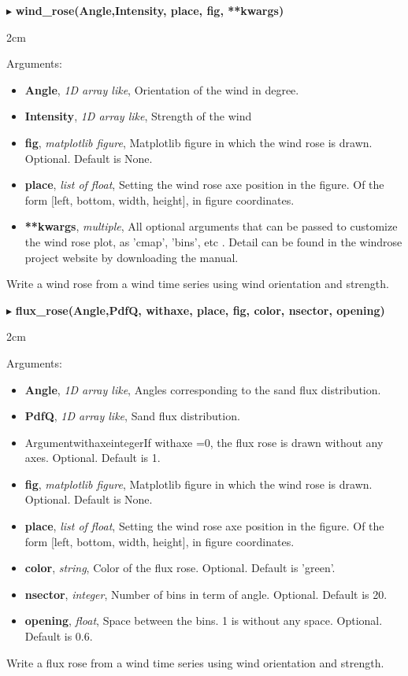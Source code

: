 \documentclass[12pt]{article}
\newenvironment{myenv}{\begin{adjustwidth}{2cm}{}}{\end{adjustwidth}}
\newcommand{\Function}[3]{\filbreak\noindent
$\blacktriangleright$ \quad\textbf{#1}
\begin{myenv}

Arguments: {#2}

{#3}
\end{myenv}
\vspace*{0.4 cm}}
\newcommand{\Argument}[3]{\noindent 
\textbf{#1}, \textit{#2}, {#3}}
\begin{document}
\Function{wind\_rose(Angle,Intensity, place, fig, **kwargs)}{
\begin{itemize}
	\item \Argument{Angle}{1D array like}{Orientation of the wind in degree.}
	\item \Argument{Intensity}{1D array like}{Strength of the wind}
	\item \Argument{fig}{matplotlib figure}{Matplotlib figure in which the wind rose is drawn. Optional. Default is None.}
	\item \Argument{place}{list of float}{Setting the wind rose axe position in the figure. Of the form [left, bottom, width, height], in figure coordinates.}
	
	\item \Argument{**kwargs}{multiple}{All optional arguments that can be passed to customize the wind rose plot, as 'cmap', 'bins', etc . Detail can be found in the windrose project website by downloading the manual.}
\end{itemize}
}{Write a wind rose from a wind time series using  wind orientation and strength.}


\Function{flux\_rose(Angle,PdfQ, withaxe, place, fig, color, nsector, opening)}{
\begin{itemize}
	\item \Argument{Angle}{1D array like}{Angles corresponding to the sand flux distribution.}
	\item \Argument{PdfQ}{1D array like}{Sand flux distribution.}
	\item Argument{withaxe}{integer}{If withaxe =0, the flux rose is drawn without any axes. Optional. Default is 1.}
	\item \Argument{fig}{matplotlib figure}{Matplotlib figure in which the wind rose is drawn. Optional. Default is None.}
	\item \Argument{place}{list of float}{Setting the wind rose axe position in the figure. Of the form [left, bottom, width, height], in figure coordinates.}
	\item \Argument{color}{string}{Color of the flux rose. Optional. Default is 'green'.}
	\item \Argument{nsector}{integer}{Number of bins in term of angle. Optional. Default is 20.}
	\item \Argument{opening}{float}{Space between the bins. 1 is without any space. Optional. Default is 0.6.}
\end{itemize}
}{Write a flux rose from a wind time series using  wind orientation and strength.}
\end{document}
